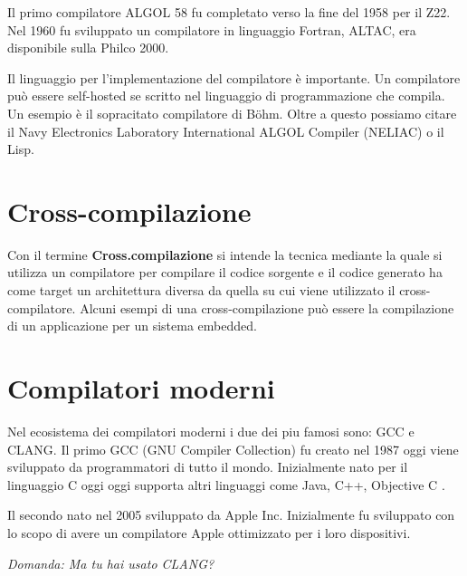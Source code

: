 \documentclass[12pt,a4paper]{report}
\begin{document}
Il primo compilatore ALGOL 58 fu completato verso la fine del 1958 per il Z22.  Nel 1960 fu sviluppato un compilatore in linguaggio Fortran, ALTAC, era disponibile sulla Philco 2000.  

Il linguaggio per l'implementazione del compilatore è importante. Un compilatore può essere self-hosted
se scritto nel linguaggio di programmazione che compila.  Un esempio è il sopracitato compilatore di Böhm. Oltre a questo possiamo citare il Navy Electronics Laboratory International ALGOL Compiler (NELIAC) o il Lisp.


\section{Cross-compilazione}
\label{Sec:Cross}
Con il termine \textbf{Cross.compilazione} si intende la tecnica mediante la quale si utilizza un compilatore per compilare il codice sorgente e il codice generato ha come target un architettura diversa da quella su cui viene utilizzato il cross-compilatore. Alcuni esempi di una cross-compilazione può essere la compilazione di un applicazione per un sistema embedded. 


\section{Compilatori moderni}
Nel ecosistema dei compilatori moderni i due dei piu famosi sono: GCC e CLANG.
Il primo GCC (GNU Compiler Collection) fu creato nel 1987 oggi viene sviluppato da programmatori di tutto il mondo. Inizialmente nato per il linguaggio C oggi oggi supporta altri linguaggi come Java, C++, Objective C \cite{GCCstory}.

Il secondo nato nel 2005 sviluppato da Apple Inc.  Inizialmente fu sviluppato con lo scopo di avere un compilatore Apple ottimizzato per i loro dispositivi\cite{ClangStory}.

\textit{Domanda: Ma tu hai usato CLANG? }
\end{document}
